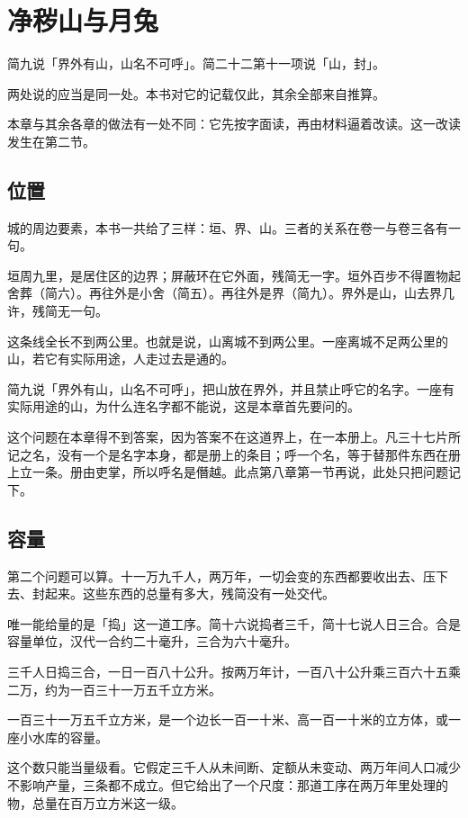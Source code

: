 \chapter{净秽山与月兔}

简九说「界外有山，山名不可呼」。简二十二第十一项说「山，封」。

两处说的应当是同一处。本书对它的记载仅此，其余全部来自推算。

本章与其余各章的做法有一处不同：它先按字面读，再由材料逼着改读。这一改读发生在第二节。

\section{位置}

城的周边要素，本书一共给了三样：垣、界、山。三者的关系在卷一与卷三各有一句。

垣周九里，是居住区的边界；屏蔽环在它外面，残简无一字。垣外百步不得置物起舍葬（简六）。再往外是小舍（简五）。再往外是界（简九）。界外是山，山去界几许，残简无一句。

这条线全长不到两公里。也就是说，山离城不到两公里。一座离城不足两公里的山，若它有实际用途，人走过去是通的。

简九说「界外有山，山名不可呼」，把山放在界外，并且禁止呼它的名字。一座有实际用途的山，为什么连名字都不能说，这是本章首先要问的。

这个问题在本章得不到答案，因为答案不在这道界上，在一本册上。凡三十七片所记之名，没有一个是名字本身，都是册上的条目；呼一个名，等于替那件东西在册上立一条。册由吏掌，所以呼名是僭越。此点第八章第一节再说，此处只把问题记下。

\section{容量}

第二个问题可以算。十一万九千人，两万年，一切会变的东西都要收出去、压下去、封起来。这些东西的总量有多大，残简没有一处交代。

唯一能给量的是「捣」这一道工序。简十六说捣者三千，简十七说人日三合。合是容量单位，汉代一合约二十毫升，三合为六十毫升。

三千人日捣三合，一日一百八十公升。按两万年计，一百八十公升乘三百六十五乘二万，约为一百三十一万五千立方米。

一百三十一万五千立方米，是一个边长一百一十米、高一百一十米的立方体，或一座小水库的容量。

这个数只能当量级看。它假定三千人从未间断、定额从未变动、两万年间人口减少不影响产量，三条都不成立。但它给出了一个尺度：那道工序在两万年里处理的物，总量在百万立方米这一级。

